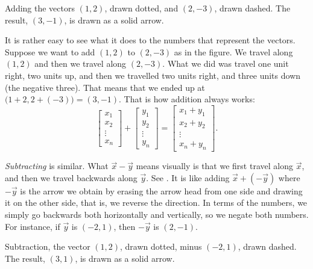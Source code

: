 \begin{myfig}
\capstart
{}
\caption{Adding the vectors $(1,2)$, drawn dotted, and $(2,-3)$, drawn dashed.  The
result, $(3,-1)$, is drawn as a solid arrow.\label{linalg-vecadd:fig}}
\end{myfig}

It is rather easy to see what it does to the numbers that represent the
vectors.  Suppose we want to add $(1,2)$ to $(2,-3)$ as in the figure.
We travel along $(1,2)$
and then we travel along $(2,-3)$.
What we did was travel one unit right, two units up, and then
we travelled two units right, and three units down (the negative three).  That
means that we ended up at $\bigl(1+2,2+(-3)\bigr) = (3,-1)$.
That is how addition always works:
\begin{equation*}
\begin{bmatrix}
x_{1} \\ x_2 \\ \vdots \\ x_n
\end{bmatrix} +
\begin{bmatrix}
y_{1} \\ y_2 \\ \vdots \\ y_n
\end{bmatrix} =
\begin{bmatrix}
x_1 + y_{1} \\ x_2+ y_2 \\ \vdots \\ x_n + y_n
\end{bmatrix} .
\end{equation*}

\emph{Subtracting} is similar.
What $\vec{x}- \vec{y}$ means visually is that
we first travel along $\vec{x}$, and then we travel
backwards along $\vec{y}$.
See .
It is like adding
$\vec{x}+ (- \vec{y})$ where $-\vec{y}$
is the arrow we obtain by erasing the arrow head
from one side and drawing it on the other side, that is, we reverse the
direction.  In terms of the numbers, we simply go backwards both
horizontally and vertically,
so we negate both numbers.  For instance, if $\vec{y}$ is $(-2,1)$,
then $-\vec{y}$ is $(2,-1)$.

\begin{myfig}
\capstart
{}
\caption{Subtraction, the vector $(1,2)$, drawn dotted, minus $(-2,1)$,
drawn dashed.  The
result, $(3,1)$, is drawn as a solid arrow.\label{linalg-vecsub:fig}}
\end{myfig}

